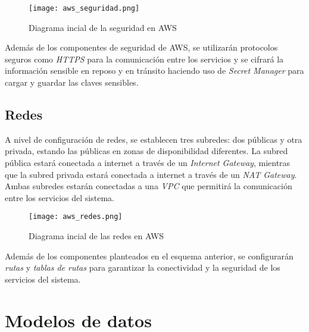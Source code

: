 \begin{figure}[H]
	\centerline{\texttt{[image: aws\_seguridad.png]}}
	\caption{Diagrama incial de la seguridad en AWS}
	\label{fig:aws_seguridad}
\end{figure}

Además de los componentes de seguridad de AWS, se utilizarán protocolos seguros
como \textit{HTTPS} para la comunicación entre los servicios y se cifrará la
información sensible en reposo y en tránsito haciendo uso de
\textit{Secret Manager} para cargar y guardar las claves sensibles.


\subsection{Redes}
A nivel de configuración de redes, se establecen tres subredes: dos públicas y
otra privada, estando las públicas en zonas de disponibilidad diferentes. La
subred pública estará conectada a internet a través de un
\textit{Internet Gateway}, mientras que la subred privada estará conectada a
internet a través de un \textit{NAT Gateway}. Ambas subredes estarán conectadas
a una \textit{VPC} que permitirá la comunicación entre los servicios del
sistema.

\begin{figure}[H]
	\centerline{\texttt{[image: aws\_redes.png]}}
	\caption{Diagrama incial de las redes en AWS}
	\label{fig:aws_redes}
\end{figure}

Además de los componentes planteados en el esquema anterior, se configurarán
\textit{rutas} y \textit{tablas de rutas} para garantizar la conectividad y la
seguridad de los servicios del sistema.


\newpage{}
\section{Modelos de datos}\label{sec:modelo}

